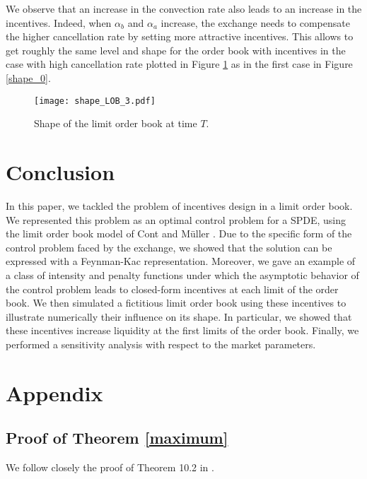 \documentclass[11pt]{article}
\begin{document}
We observe that an increase in the convection rate also leads to an increase in the incentives. Indeed, when $\alpha_b$ and $\alpha_a$ increase, the exchange needs to compensate the higher cancellation rate by setting more attractive incentives. This allows to get roughly the same level and shape for the order book with incentives in the case with high cancellation rate plotted in Figure \ref{shape_3} as in the first case in Figure \ref{shape_0}.

\begin{figure}[!h]\centering
\texttt{[image: shape\_LOB\_3.pdf]}\\
\caption{Shape of the limit order book at time $T$.}\label{shape_3}
\end{figure}
\newpage 

\section{Conclusion}
In this paper, we tackled the problem of incentives design in a limit order book. We represented this problem as an optimal control problem for a SPDE, using the limit order book model of Cont and Müller \cite{cont2021stochastic}. Due to the specific form of the control problem faced by the exchange, we showed that the solution can be expressed with a Feynman-Kac representation. Moreover, we gave an example of a class of intensity and penalty functions under which the asymptotic behavior of the control problem leads to closed-form incentives at each limit of the order book. We then simulated a fictitious limit order book using these incentives to illustrate numerically their influence on its shape. In particular, we showed that these incentives increase liquidity at the first limits of the order book.  Finally, we performed a sensitivity analysis with respect to the market parameters. 
\appendix 

\section{Appendix}\label{sec_proofs}

\subsection{Proof of Theorem \ref{maximum}}\label{Proof1}

We follow closely the proof of Theorem 10.2 in \cite{oksendal2007applied}.\\
\end{document}
